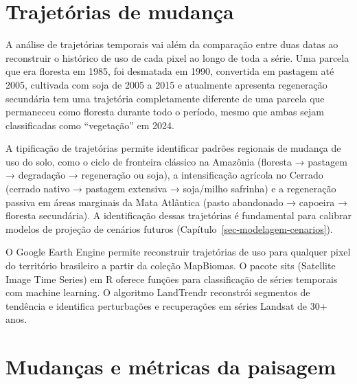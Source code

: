 \documentclass[
  portuguese,
  11pt,
  a4paper,
  open=any]{scrbook}
\begin{document}
\section{Trajetórias de mudança}\label{trajetuxf3rias-de-mudanuxe7a}

A análise de trajetórias temporais vai além da comparação entre duas
datas ao reconstruir o histórico de uso de cada pixel ao longo de toda a
série. Uma parcela que era floresta em 1985, foi desmatada em 1990,
convertida em pastagem até 2005, cultivada com soja de 2005 a 2015 e
atualmente apresenta regeneração secundária tem uma trajetória
completamente diferente de uma parcela que permaneceu como floresta
durante todo o período, mesmo que ambas sejam classificadas como
``vegetação'' em 2024.

A tipificação de trajetórias permite identificar padrões regionais de
mudança de uso do solo, como o ciclo de fronteira clássico na Amazônia
(floresta → pastagem → degradação → regeneração ou soja), a
intensificação agrícola no Cerrado (cerrado nativo → pastagem extensiva
→ soja/milho safrinha) e a regeneração passiva em áreas marginais da
Mata Atlântica (pasto abandonado → capoeira → floresta secundária). A
identificação dessas trajetórias é fundamental para calibrar modelos de
projeção de cenários futuros (Capítulo~\ref{sec-modelagem-cenarios}).

\begin{tcolorbox}[enhanced jigsaw, colbacktitle=quarto-callout-tip-color!10!white, coltitle=black, opacityback=0, breakable, left=2mm, colback=white, bottomtitle=1mm, toptitle=1mm, titlerule=0mm, arc=.35mm, opacitybacktitle=0.6, leftrule=.75mm, colframe=quarto-callout-tip-color-frame, title=\textcolor{quarto-callout-tip-color}{\faLightbulb}\hspace{0.5em}{Ferramentas para análise de trajetórias}, rightrule=.15mm, bottomrule=.15mm, toprule=.15mm]

O Google Earth Engine permite reconstruir trajetórias de uso para
qualquer pixel do território brasileiro a partir da coleção MapBiomas. O
pacote sits (Satellite Image Time Series) em R oferece funções para
classificação de séries temporais com machine learning. O algoritmo
LandTrendr reconstrói segmentos de tendência e identifica perturbações e
recuperações em séries Landsat de 30+ anos.

\end{tcolorbox}

\section{Mudanças e métricas da
paisagem}\label{mudanuxe7as-e-muxe9tricas-da-paisagem}
\end{document}
